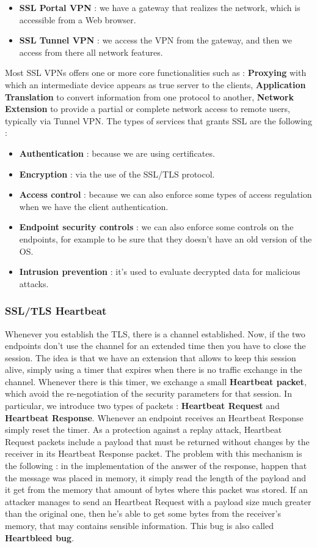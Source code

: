 \documentclass[11pt]{article}
\begin{document}
\begin{itemize}
\item \textbf{SSL Portal VPN} : we have a gateway that realizes the network, which is accessible from a Web browser.
\item \textbf{SSL Tunnel VPN} : we access the VPN from the gateway, and then we access from there all network features.
\end{itemize} 
Most SSL VPNs offers one or more core functionalities such as : \textbf{Proxying} with which an intermediate device appears as true server to the clients, \textbf{Application Translation} to convert information from one protocol to another, \textbf{Network Extension} to provide a partial or complete network access to remote users, typically via Tunnel VPN. The types of services that grants SSL are the following :
\begin{itemize}
\item \textbf{Authentication} : because we are using certificates.
\item \textbf{Encryption} : via the use of the SSL/TLS protocol.
\item \textbf{Access control} : because we can also enforce some types of access regulation when we have the client authentication.
\item \textbf{Endpoint security controls} : we can also enforce some controls on the endpoints, for example to be sure that they doesn't have an old version of the OS.
\item \textbf{Intrusion prevention} : it's used to evaluate decrypted data for malicious attacks. 
\end{itemize}
\subsubsection{SSL/TLS Heartbeat}
Whenever you establish the TLS, there is a channel established. Now, if the two endpoints don't use the channel for an extended time then you have to close the session. The idea is that we have an extension that allows to keep this session alive, simply using a timer that expires when there is no traffic exchange in the channel. Whenever there is this timer, we exchange a small \textbf{Heartbeat packet}, which avoid the re-negotiation of the security parameters for that session. In particular, we introduce two types of packets : \textbf{Heartbeat Request} and \textbf{Heartbeat Response}. Whenever an endpoint receives an Heartbeat Response simply reset the timer. As a protection against a replay attack, Heartbeat Request packets include a payload that must be returned without changes by the receiver in its Heartbeat Response packet.  The problem with this mechanism is the following : in the implementation of the answer of the response, happen that the message was placed in memory, it simply read the length of the payload and it get from the memory that amount of bytes where this packet was stored. If an attacker manages to send an Heartbeat Request with a payload size much greater than the original one, then he's able to get some bytes from the receiver's memory, that may contains sensible information. This bug is also called \textbf{Heartbleed bug}.
\end{document}
